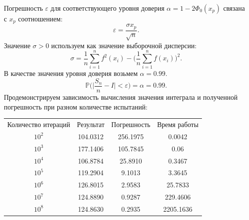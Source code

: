 \documentclass[11pt]{article}
\begin{document}
Погрешность $\varepsilon$ для соответствующего уровня доверия $\alpha = 1 - 2\Phi_0(x_p)$ связана с $x_p$ соотношением:
\[ \varepsilon = \frac{\sigma x_p}{\sqrt{n}}.\]
Значение $\sigma > 0$ используем как значение выборочной дисперсии:
\[ \sigma = \frac{1}{n}\sum_{i = 1}^{n}f^2(x_i) - \bigg( \frac{1}{n}\sum_{i = 1}^{n}f(x_i)\bigg)^2. \]
В качестве значения уровня доверия возьмем $\alpha = 0.99$.
\[  \mathbb{P}\bigg( \bigg|\frac{S_n}{n} - I \bigg| < \varepsilon\bigg) = \alpha = 0.99.\]
Продемонстрируем зависимость вычисления значения интеграла и полученной погрешность при разном количестве испытаний:
\begin{center}
	\begin{tabular}{|c|c|c|c|}
		\hline
		Количество итераций &Результат & Погрешность & Время работы \\
		$10^2$ & 104.0312 & 256.1975 & 0.0042\\
		$10^3$ & 177.1406 & 105.7845 & 0.06 \\
		$10^4$ & 106.8784 & 25.8910 & 0.3467 \\
		$10^5$ & 119.2904 & 9.1013  & 3.3645 \\
		$10^6$ & 126.8015 & 2.9583& 25.7833\\
		$10^7$ & 124.8890 & 0.9287& 229.4606\\
		$10^8$ & 124.8630 & 0.2935& 2205.1636\\
		\hline
	\end{tabular}
\end{center}
\end{document}
